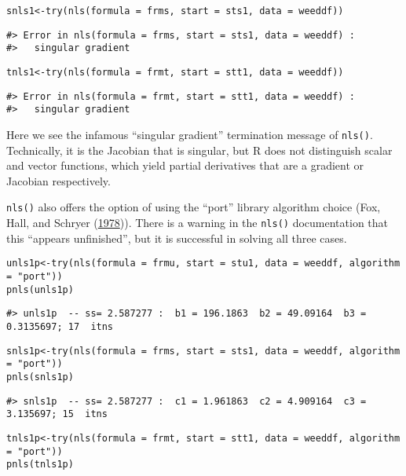 \begin{verbatim}
snls1<-try(nls(formula = frms, start = sts1, data = weeddf))
\end{verbatim}

\begin{verbatim}
#> Error in nls(formula = frms, start = sts1, data = weeddf) : 
#>   singular gradient
\end{verbatim}

\begin{verbatim}
tnls1<-try(nls(formula = frmt, start = stt1, data = weeddf))
\end{verbatim}

\begin{verbatim}
#> Error in nls(formula = frmt, start = stt1, data = weeddf) : 
#>   singular gradient
\end{verbatim}

Here we see the infamous ``singular gradient'' termination message of \texttt{nls()}.
Technically, it is the Jacobian that is singular, but R does not distinguish scalar
and vector functions, which yield partial derivatives that are a gradient or Jacobian
respectively.

\texttt{nls()} also offers the option of using the ``port'' library algorithm
choice (Fox, Hall, and Schryer (\protect\hyperlink{ref-FoxHallSchryer1978}{1978})). There is a warning in the \texttt{nls()} documentation that
this ``appears unfinished'', but it is successful in solving all three cases.

\begin{verbatim}
unls1p<-try(nls(formula = frmu, start = stu1, data = weeddf, algorithm = "port"))
pnls(unls1p)
\end{verbatim}

\begin{verbatim}
#> unls1p  -- ss= 2.587277 :  b1 = 196.1863  b2 = 49.09164  b3 = 0.3135697; 17  itns
\end{verbatim}

\begin{verbatim}
snls1p<-try(nls(formula = frms, start = sts1, data = weeddf, algorithm = "port"))
pnls(snls1p)
\end{verbatim}

\begin{verbatim}
#> snls1p  -- ss= 2.587277 :  c1 = 1.961863  c2 = 4.909164  c3 = 3.135697; 15  itns
\end{verbatim}

\begin{verbatim}
tnls1p<-try(nls(formula = frmt, start = stt1, data = weeddf, algorithm = "port"))
pnls(tnls1p)
\end{verbatim}

